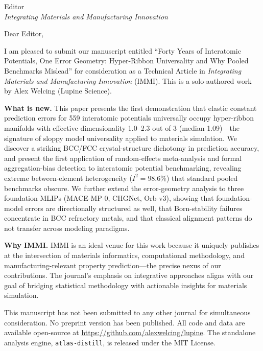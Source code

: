 \documentclass[11pt]{letter}
\begin{document}
\begin{letter}{Editor\\\textit{Integrating Materials and Manufacturing Innovation}}

\opening{Dear Editor,}

I am pleased to submit our manuscript entitled ``Forty Years of Interatomic Potentials, One Error Geometry: Hyper-Ribbon Universality and Why Pooled Benchmarks Mislead'' for consideration as a Technical Article in \textit{Integrating Materials and Manufacturing Innovation} (IMMI). This is a solo-authored work by Alex Welcing (Lupine Science).

\textbf{What is new.} This paper presents the first demonstration that elastic constant prediction errors for 559 interatomic potentials universally occupy hyper-ribbon manifolds with effective dimensionality 1.0--2.3 out of 3 (median 1.09)---the signature of sloppy model universality applied to materials simulation. We discover a striking BCC/FCC crystal-structure dichotomy in prediction accuracy, and present the first application of random-effects meta-analysis and formal aggregation-bias detection to interatomic potential benchmarking, revealing extreme between-element heterogeneity ($I^2 = 98.6\%$) that standard pooled benchmarks obscure. We further extend the error-geometry analysis to three foundation MLIPs (MACE-MP-0, CHGNet, Orb-v3), showing that foundation-model errors are directionally structured as well, that Born-stability failures concentrate in BCC refractory metals, and that classical alignment patterns do not transfer across modeling paradigms.

\textbf{Why IMMI.} IMMI is an ideal venue for this work because it uniquely publishes at the intersection of materials informatics, computational methodology, and manufacturing-relevant property prediction---the precise nexus of our contributions. The journal's emphasis on integrative approaches aligns with our goal of bridging statistical methodology with actionable insights for materials simulation.

This manuscript has not been submitted to any other journal for simultaneous consideration. No preprint version has been published. All code and data are available open-source at \url{https://github.com/alexwelcing/lupine}. The standalone analysis engine, \texttt{atlas-distill}, is released under the MIT License.


\end{letter}
\end{document}

